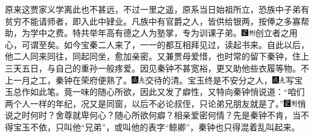 原来这贾家义学离此也不甚远，不过一里之遥，原系当日始祖所立，恐族中子弟有贫穷不能请师者，即入此中肄业。凡族中有官爵之人，皆供给银两，按俸之多寡帮助，为学中之费。特共举年高有德之人为塾掌，专为训课子弟。{\includegraphics[width=3mm]{../Images/00006}\includegraphics[width=3mm]{../Images/00011}\footnotesize \kaishu 创立者之用心，可谓至矣。}如今宝秦二人来了，一一的都互相拜见过，读起书来。自此以后，他二人同来同往，同起同坐，愈加亲密。又兼贾母爱惜，也时常的留下秦钟，住上三天五日，与自己的重孙一般疼爱。因见秦钟不甚宽裕，更又助他些衣履等物。不上一月之工，秦钟在荣府便熟了。{\includegraphics[width=3mm]{../Images/00005}\includegraphics[width=3mm]{../Images/00012}\footnotesize \kaishu 交待的清。}宝玉终是不安分之人，{\includegraphics[width=3mm]{../Images/00005}\includegraphics[width=3mm]{../Images/00012}\footnotesize \kaishu 写宝玉总作如此笔。}竟一味的随心所欲，因此又发了癖性，又特向秦钟悄说道：“咱们两个人一样的年纪，况又是同窗，以后不必论叔侄，只论弟兄朋友就是了。”{\includegraphics[width=3mm]{../Images/00006}\includegraphics[width=3mm]{../Images/00011}\footnotesize \kaishu 悄说之时何时？舍尊就卑何心？随心所欲何癖？相亲爱密何情？}先是秦钟不肯，当不得宝玉不依，只叫他“兄弟”，或叫他的表字“鲸卿”，秦钟也只得混着乱叫起来。

